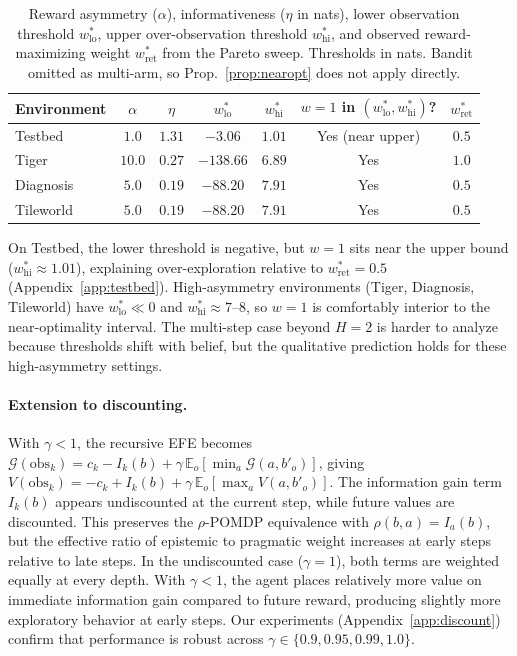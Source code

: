 \documentclass[runningheads]{llncs}
\begin{document}
\begin{table}[ht]
\centering
\caption{Reward asymmetry ($\alpha$), informativeness ($\eta$ in nats), lower observation threshold $w^*_{\mathrm{lo}}$, upper over-observation threshold $w^*_{\mathrm{hi}}$, and observed reward-maximizing weight $w^*_{\mathrm{ret}}$ from the Pareto sweep. Thresholds in nats. Bandit omitted as multi-arm, so Prop.~\ref{prop:nearopt} does not apply directly.}
\label{tab:alpha_eta}
\begin{small}
\begin{tabular}{lcccccc}
\toprule
Environment & $\alpha$ & $\eta$ & $w^*_{\mathrm{lo}}$ & $w^*_{\mathrm{hi}}$ & $w{=}1$ in $(w^*_{\mathrm{lo}},w^*_{\mathrm{hi}})$? & $w^*_{\mathrm{ret}}$ \\
\midrule
Testbed & $1.0$ & $1.31$ & $-3.06$ & $1.01$ & Yes (near upper) & $0.5$ \\
Tiger & $10.0$ & $0.27$ & $-138.66$ & $6.89$ & Yes & $1.0$ \\
Diagnosis & $5.0$ & $0.19$ & $-88.20$ & $7.91$ & Yes & $0.5$ \\
Tileworld & $5.0$ & $0.19$ & $-88.20$ & $7.91$ & Yes & $0.5$ \\
\bottomrule
\end{tabular}
\end{small}
\end{table}

On Testbed, the lower threshold is negative, but $w{=}1$ sits near the upper bound ($w^*_{\mathrm{hi}} \approx 1.01$), explaining over-exploration relative to $w^*_{\mathrm{ret}}{=}0.5$ (Appendix~\ref{app:testbed}). High-asymmetry environments (Tiger, Diagnosis, Tileworld) have $w^*_{\mathrm{lo}} \ll 0$ and $w^*_{\mathrm{hi}} \approx 7$--$8$, so $w{=}1$ is comfortably interior to the near-optimality interval. The multi-step case beyond $H{=}2$ is harder to analyze because thresholds shift with belief, but the qualitative prediction holds for these high-asymmetry settings.

\paragraph{Extension to discounting.} With $\gamma < 1$, the recursive EFE becomes $\mathcal{G}(\text{obs}_k) = c_k - I_k(b) + \gamma\, \mathbb{E}_o[\min_a \mathcal{G}(a, b'_o)]$, giving $V(\text{obs}_k) = -c_k + I_k(b) + \gamma\, \mathbb{E}_o[\max_a V(a, b'_o)]$. The information gain term $I_k(b)$ appears undiscounted at the current step, while future values are discounted. This preserves the $\rho$-POMDP equivalence with $\rho(b,a) = I_a(b)$, but the effective ratio of epistemic to pragmatic weight increases at early steps relative to late steps. In the undiscounted case ($\gamma{=}1$), both terms are weighted equally at every depth. With $\gamma < 1$, the agent places relatively more value on immediate information gain compared to future reward, producing slightly more exploratory behavior at early steps. Our experiments (Appendix~\ref{app:discount}) confirm that performance is robust across $\gamma \in \{0.9, 0.95, 0.99, 1.0\}$.
\end{document}
